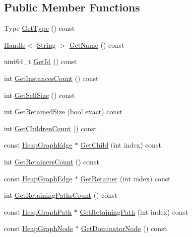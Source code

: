 \subsection*{Public Member Functions}
\begin{DoxyCompactItemize}
\item 
Type \hyperlink{classv8_1_1_heap_graph_node_a5e07fc855bded52229e62b855fa08c5d}{Get\+Type} () const 
\item 
\hyperlink{classv8_1_1_handle}{Handle}$<$ \hyperlink{classv8_1_1_string}{String} $>$ \hyperlink{classv8_1_1_heap_graph_node_af5f24ee6c07a57814e18bd317cb5576a}{Get\+Name} () const 
\item 
uint64\+\_\+t \hyperlink{classv8_1_1_heap_graph_node_a400431a5073604742b13372ad901bd78}{Get\+Id} () const 
\item 
int \hyperlink{classv8_1_1_heap_graph_node_acdbdd654259028c99d83129320606237}{Get\+Instances\+Count} () const 
\item 
int \hyperlink{classv8_1_1_heap_graph_node_acd3bd8860aa399ac56fa8a0229af7b85}{Get\+Self\+Size} () const 
\item 
int \hyperlink{classv8_1_1_heap_graph_node_a7fd9e0e52247c272964505c5eff41461}{Get\+Retained\+Size} (bool exact) const 
\item 
int \hyperlink{classv8_1_1_heap_graph_node_a0a49abe006755dd5536d15ae42f552d4}{Get\+Children\+Count} () const 
\item 
const \hyperlink{classv8_1_1_heap_graph_edge}{Heap\+Graph\+Edge} $\ast$ \hyperlink{classv8_1_1_heap_graph_node_ac3435611573e58b6614aeaab68442905}{Get\+Child} (int index) const 
\item 
int \hyperlink{classv8_1_1_heap_graph_node_a9de00d0733343b4b16823654813c22a1}{Get\+Retainers\+Count} () const 
\item 
const \hyperlink{classv8_1_1_heap_graph_edge}{Heap\+Graph\+Edge} $\ast$ \hyperlink{classv8_1_1_heap_graph_node_a260c115d00b7960a08ea34c6a8bee058}{Get\+Retainer} (int index) const 
\item 
int \hyperlink{classv8_1_1_heap_graph_node_a9d1d049b6ecbc94d2753f10af782ba83}{Get\+Retaining\+Paths\+Count} () const 
\item 
const \hyperlink{classv8_1_1_heap_graph_path}{Heap\+Graph\+Path} $\ast$ \hyperlink{classv8_1_1_heap_graph_node_a0145bac669b571f6ed3e04722402468c}{Get\+Retaining\+Path} (int index) const 
\item 
const \hyperlink{classv8_1_1_heap_graph_node}{Heap\+Graph\+Node} $\ast$ \hyperlink{classv8_1_1_heap_graph_node_abdb4f9cb4fc89f5b65d3a499a6748fa7}{Get\+Dominator\+Node} () const 
\end{DoxyCompactItemize}



